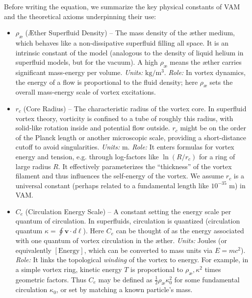Before writing the equation, we summarize the key physical constants of VAM and the theoretical axioms underpinning their use:\begin{itemize}

\item
$\rho_{\text{\ae}}$ (Æther Superfluid Density) – The mass density of the æther medium, which behaves like a non-dissipative superfluid filling all space. It is an intrinsic constant of the model (analogous to the density of liquid helium in superfluid models, but for the vacuum). A high $\rho_{\text{\ae}}$ means the æther carries significant mass-energy per volume. \textit{Units:} $\mathrm{kg/m^3}$. \textit{Role:} In vortex dynamics, the energy of a flow is proportional to the fluid density; here $\rho_{\text{\ae}}$ sets the overall mass-energy scale of vortex excitations.

\item
$r_c$ (Core Radius) – The characteristic radius of the vortex core. In superfluid vortex theory, vorticity is confined to a tube of roughly this radius, with solid-like rotation inside and potential flow outside. $r_c$ might be on the order of the Planck length or another microscopic scale, providing a short-distance cutoff to avoid singularities. \textit{Units:} $\mathrm{m}$. \textit{Role:} It enters formulas for vortex energy and tension, e.g. through log-factors like $\ln(R/r_c)$ for a ring of large radius $R$. It effectively parameterizes the “thickness” of the vortex filament and thus influences the self-energy of the vortex. We assume $r_c$ is a universal constant (perhaps related to a fundamental length like $10^{-35}$ m) in VAM.

\item
$C_e$ (Circulation Energy Scale) – A constant setting the energy scale per quantum of circulation. In superfluids, circulation is quantized (circulation quantum $\kappa = \oint \mathbf{v}\cdot d\mathbf{\ell}$). Here $C_e$ can be thought of as the energy associated with one quantum of vortex circulation in the æther. \textit{Units:} Joules (or equivalently $[\text{Energy}]$, which can be converted to mass units via $E=mc^2$). \textit{Role:} It links the topological \textit{winding} of the vortex to energy. For example, in a simple vortex ring, kinetic energy $T$ is proportional to $\rho_{\text{\ae}},\kappa^2$ times geometric factors. Thus $C_e$ may be defined as $\frac{1}{2}\rho_{\text{\ae}}\kappa_0^2$ for some fundamental circulation $\kappa_0$, or set by matching a known particle’s mass.


\end{itemize}

